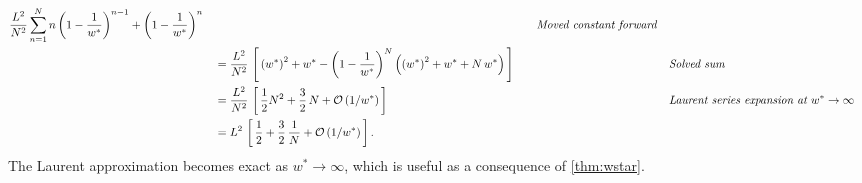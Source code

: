 \begin{proofEnd}
\begin{alignat}{2}
    \frac{L^2}{N^2}\sum^{N}_{n=1}
      n \, {\left(1 - \frac{1}{w^*}\right)}^{n-1}
      +
      {\left(1 - \frac{1}{w^*}\right)}^{n} 
    \nonumber
    &&\quad\text{\textit{Moved constant forward}}
    \\
    &\quad=
    \frac{L^2}{N^2} \,
    \left[\,
      {\left(w^*\right)}^2 + w^*
      -
      {\left(1 - \frac{1}{w^*}\right)}^N
      \left(
        {\left(w^*\right)}^2 + w^* + N\,w^*
      \right)
    \,\right]
    \nonumber
    &&\quad\text{\textit{Solved sum}}
    \\
    &\quad=
    \frac{L^2}{N^2} \,
    \left[\,
    \frac{1}{2} N^2 + \frac{3}{2}\,N 
    + \mathcal{O}\left(1/w^*\right)
    \,\right]
    \nonumber
    &&\quad\text{\textit{Laurent series expansion at \(w^* \rightarrow \infty\)}}
    \\
    &\quad=
    L^2 \,
    \left[\,
    \frac{1}{2} + \frac{3}{2}\,\frac{1}{N}
    + \mathcal{O}\left(1/w^*\right)
    \,\right].
    \nonumber
  \end{alignat}
  The Laurent approximation becomes exact as \(w^* \rightarrow \infty\), which is useful as a consequence of \cref{thm:wstar}.
\end{proofEnd}

